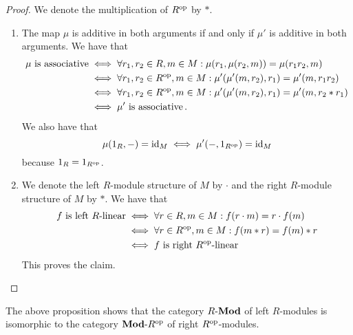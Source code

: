 \begin{proof}
  We denote the multiplication of $R^{\mathrm{op}}$ by $*$.
  \begin{enumerate}
    \item
      The map $\mu$ is additive in both arguments if and only if $\mu'$ is additive in both arguments.
      We have that
      \begin{align*}
              \text{$\mu$ is associative}
        &\iff \forall r_1, r_2 \in R, m \in M: \mu(r_1, \mu(r_2, m)) = \mu(r_1 r_2, m)  \\
        &\iff \forall r_1, r_2 \in R^{\mathrm{op}}, m \in M: \mu'(\mu'(m, r_2), r_1) = \mu'(m, r_1 r_2)  \\
        &\iff \forall r_1, r_2 \in R^{\mathrm{op}}, m \in M: \mu'(\mu'(m, r_2), r_1) = \mu'(m, r_2 * r_1)  \\
        &\iff \text{$\mu'$ is associative} \,.
      \end{align*}
      We also have that
      \[
              \mu(1_R, -) = \operatorname{id}_M
        \iff  \mu'(-, 1_{R^{\mathrm{op}}}) = \operatorname{id}_M
      \]
      because $1_R = 1_{R^{\mathrm{op}}}$.
    \item
      We denote the left $R$-module structure of $M$ by $\cdot$ and the right $R$-module structure of $M$ by $*$.
      We have that
      \begin{align*}
              \text{$f$ is left $R$-linear}
        &\iff \forall r \in R, m \in M: f(r \cdot m) = r \cdot f(m) \\
        &\iff \forall r \in R^{\mathrm{op}}, m \in M: f(m * r) = f(m) * r     \\
        &\iff \text{$f$ is right $R^{\mathrm{op}}$-linear}
      \end{align*}
      This proves the claim.
    \qedhere
  \end{enumerate}
\end{proof}


\begin{remark}
  The above proposition shows that the category $R\text{-}\mathbf{Mod}$ of left $R$-modules is isomorphic to the category $\mathbf{Mod}\text{-}R^{\mathrm{op}}$ of right $R^{\mathrm{op}}$-modules.
\end{remark}


